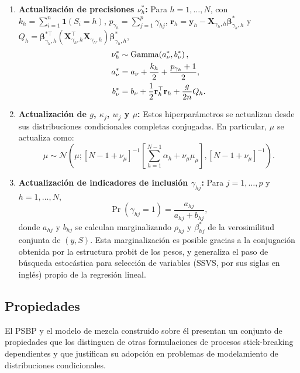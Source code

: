 \begin{enumerate}
    \item \textbf{Actualización de precisiones $\nu_h^*$:} Para
    $h = 1, \dots, N$, con $k_h = \sum_{i=1}^n \mathbf{1}(S_i = h)$,
    $p_{\gamma_h} = \sum_{j=1}^p \gamma_{hj}$,
    $\mathbf{r}_h = \mathbf{y}_h -
    \mathbf{X}_{\gamma_h,h}\boldsymbol{\beta}_{\gamma_h,h}^*$ y
    $Q_h = \boldsymbol{\beta}_{\gamma_h,h}^{*\top}
    (\mathbf{X}_{\gamma_h,h}^\top\mathbf{X}_{\gamma_h,h})
    \boldsymbol{\beta}_{\gamma_h,h}^*$,
    \begin{align}
        \nu_h^* &\sim \mathrm{Gamma}\!\left(a_\nu^*, b_\nu^*\right),
        \notag\\
        a_\nu^* &= a_\nu + \frac{k_h}{2} +
        \frac{p_{\gamma_h}+1}{2}, \notag\\
        b_\nu^* &= b_\nu + \frac{1}{2}\mathbf{r}_h^\top\mathbf{r}_h
        + \frac{g}{2n}Q_h.
    \end{align}
 
    \item \textbf{Actualización de $g$, $\kappa_j$, $w_j$ y $\mu$:}
    Estos hiperparámetros se actualizan desde sus distribuciones
    condicionales completas conjugadas. En particular, $\mu$ se
    actualiza como:
    \begin{equation}
        \mu \sim \mathcal{N}\!\left(\mu;
        [N - 1 + \nu_\mu]^{-1}\!
        \left[\sum_{h=1}^{N-1}\alpha_h +
        \nu_\mu\mu_\mu\right],
        [N - 1 + \nu_\mu]^{-1}\right).
    \end{equation}
 
    \item \textbf{Actualización de indicadores de inclusión
    $\gamma_{hj}$:} Para $j = 1, \dots, p$ y $h = 1, \dots, N$,
    \begin{equation}
        \Pr(\gamma_{hj} = 1) = \frac{a_{hj}}{a_{hj} + b_{hj}},
    \end{equation}
    donde $a_{hj}$ y $b_{hj}$ se calculan marginalizando $\rho_{hj}$
    y $\beta_{hj}^*$ de la verosimilitud conjunta de $(y, S)$. Esta
    marginalización es posible gracias a la conjugación obtenida por
    la estructura probit de los pesos, y generaliza el paso de
    búsqueda estocástica para selección de variables (SSVS, por sus
    siglas en inglés) propio de la regresión lineal.
 
\end{enumerate}
 
 
\subsection{Propiedades}
\label{03_03_03_propiedades}
El PSBP y el modelo de mezcla construido sobre él presentan un conjunto de propiedades que los distinguen de otras formulaciones de procesos stick-breaking dependientes y que justifican su adopción en problemas de modelamiento de distribuciones condicionales.\\
 
